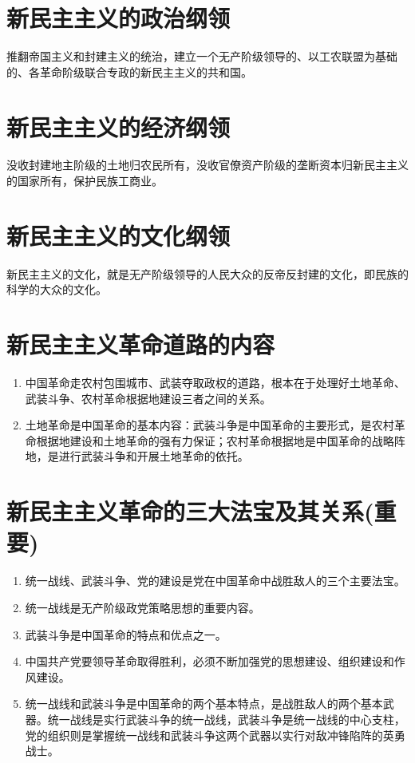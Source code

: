 \documentclass[12pt, a4paper, oneside]{ctexbook}
\begin{document}
\section{新民主主义的政治纲领}

推翻帝国主义和封建主义的统治，建立一个无产阶级领导的、以工农联盟为基础的、各革命阶级联合专政的新民主主义的共和国。

\section{新民主主义的经济纲领}

没收封建地主阶级的土地归农民所有，没收官僚资产阶级的垄断资本归新民主主义的国家所有，保护民族工商业。

\section{新民主主义的文化纲领}

新民主主义的文化，就是无产阶级领导的人民大众的反帝反封建的文化，即民族的科学的大众的文化。

\section{新民主主义革命道路的内容}

\begin{enumerate}[label=（\arabic*）]
\item 中国革命走农村包围城市、武装夺取政权的道路，根本在于处理好土地革命、武装斗争、农村革命根据地建设三者之间的关系。

\item 土地革命是中国革命的基本内容：武装斗争是中国革命的主要形式，是农村革命根据地建设和土地革命的强有力保证；农村革命根据地是中国革命的战略阵地，是进行武装斗争和开展土地革命的依托。
\end{enumerate}

\section{新民主主义革命的三大法宝及其关系(重要)}

\begin{enumerate}[label=（\arabic*）]
\item 统一战线、武装斗争、党的建设是党在中国革命中战胜敌人的三个主要法宝。

\item 统一战线是无产阶级政党策略思想的重要内容。

\item 武装斗争是中国革命的特点和优点之一。

\item 中国共产党要领导革命取得胜利，必须不断加强党的思想建设、组织建设和作风建设。

\item 统一战线和武装斗争是中国革命的两个基本特点，是战胜敌人的两个基本武器。统一战线是实行武装斗争的统一战线，武装斗争是统一战线的中心支柱，党的组织则是掌握统一战线和武装斗争这两个武器以实行对敌冲锋陷阵的英勇战士。
\end{enumerate}
\end{document}
